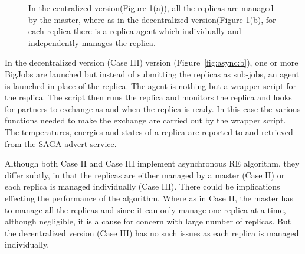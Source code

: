 \documentclass[a4paper,10pt]{article}
\newcommand{\jhanote}[1]{ {\textcolor{red} { ***shantenu: #1 }}}
\newcommand{\jhanote}[1]{}
\begin{document}
\begin{figure}
\centering
{}
\caption{\small In the centralized version(Figure 1(a)), all the replicas are managed by the master, where as in the decentralized version(Figure 1(b), for each replica there is a replica agent which individually and independently manages the replica.}
\label{fig:async}
\end{figure}
 

In the decentralized version (Case III) version
(Figure~\ref{fig:async:b}), one or more BigJobs are launched
but instead of submitting the replicas as sub-jobs, an agent is
launched in place of the replica. The agent is nothing but a wrapper
script for the replica. The script then runs the replica and monitors
the replica and looks for partners to exchange as and when the replica
is ready. In this case the various functions needed to make the
exchange are carried out by the wrapper script. The temperatures,
energies and states of a replica are reported to and retrieved from
the SAGA advert service. 

Although both Case II and Case III implement asynchronous 
RE algorithm, they differ subtly, in that the replicas
are either managed by a master (Case II) or each replica
is managed individually (Case III).
There could be implications effecting the performance of the
algorithm. Where as in Case II, the master has to manage all the
replicas and since it can only manage one replica at a time, although negligible, it is a cause for concern with large number of replicas. %
But the decentralized version (Case III) has no
such issues as each replica is managed individually. %
  
\end{document}

